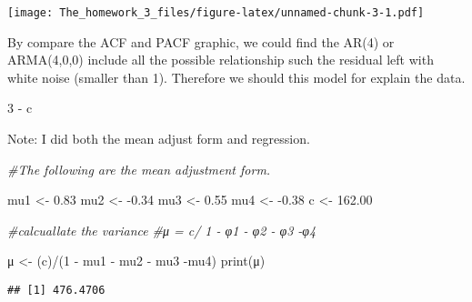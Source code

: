 \documentclass[
]{article}
\newenvironment{Shaded}{\begin{snugshade}}{\end{snugshade}}
\newcommand{\CommentTok}[1]{\textcolor[rgb]{0.56,0.35,0.01}{\textit{#1}}}
\newcommand{\DecValTok}[1]{\textcolor[rgb]{0.00,0.00,0.81}{#1}}
\newcommand{\FloatTok}[1]{\textcolor[rgb]{0.00,0.00,0.81}{#1}}
\newcommand{\FunctionTok}[1]{\textcolor[rgb]{0.00,0.00,0.00}{#1}}
\newcommand{\NormalTok}[1]{#1}
\newcommand{\OtherTok}[1]{\textcolor[rgb]{0.56,0.35,0.01}{#1}}
\newcommand{\SpecialCharTok}[1]{\textcolor[rgb]{0.00,0.00,0.00}{#1}}
\begin{document}
\texttt{[image: The\_homework\_3\_files/figure-latex/unnamed-chunk-3-1.pdf]}

By compare the ACF and PACF graphic, we could find the AR(4) or
ARMA(4,0,0) include all the possible relationship such the residual left
with white noise (smaller than 1). Therefore we should this model for
explain the data.

3 - c

Note: I did both the mean adjust form and regression.

\begin{Shaded}
\begin{Highlighting}[]
\CommentTok{\#The following are the mean adjustment form.}

\NormalTok{mu1 }\OtherTok{\textless{}{-}} \FloatTok{0.83}
\NormalTok{mu2 }\OtherTok{\textless{}{-}} \SpecialCharTok{{-}}\FloatTok{0.34}
\NormalTok{mu3 }\OtherTok{\textless{}{-}} \FloatTok{0.55}
\NormalTok{mu4 }\OtherTok{\textless{}{-}} \SpecialCharTok{{-}}\FloatTok{0.38}
\NormalTok{c }\OtherTok{\textless{}{-}} \FloatTok{162.00}

\CommentTok{\#calcuallate the variance}
\CommentTok{\#μ = c/ 1 {-} φ1 {-} φ2 {-} φ3 {-}φ4}


\NormalTok{μ }\OtherTok{\textless{}{-}}\NormalTok{ (c)}\SpecialCharTok{/}\NormalTok{(}\DecValTok{1} \SpecialCharTok{{-}}\NormalTok{ mu1 }\SpecialCharTok{{-}}\NormalTok{ mu2 }\SpecialCharTok{{-}}\NormalTok{ mu3 }\SpecialCharTok{{-}}\NormalTok{mu4)}
\FunctionTok{print}\NormalTok{(μ)}
\end{Highlighting}
\end{Shaded}

\begin{verbatim}
## [1] 476.4706
\end{verbatim}
\end{document}
